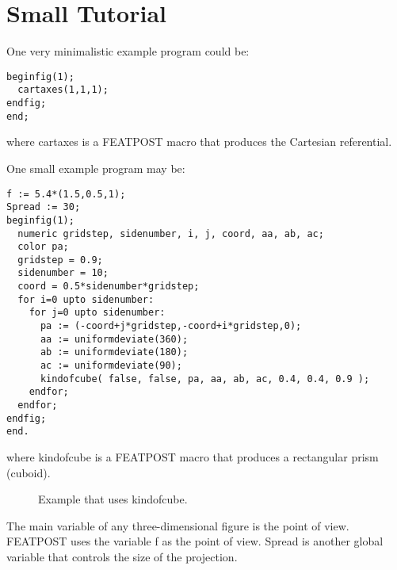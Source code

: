 \documentclass[a4paper]{article}
\newif\ifpdf
\begin{document}
\section{Small Tutorial}

One very minimalistic example program could be:
\begin{tscreen}
\begin{verbatim}
beginfig(1);
  cartaxes(1,1,1);
endfig;
end;
\end{verbatim}
\end{tscreen}
where {\ttfamily cartaxes} is a 
{\ttfamily FEATPOST} macro that produces
the Cartesian referential.

One small example program may be:
\begin{tscreen}
\begin{verbatim}
f := 5.4*(1.5,0.5,1);
Spread := 30;
beginfig(1);
  numeric gridstep, sidenumber, i, j, coord, aa, ab, ac;
  color pa;
  gridstep = 0.9;
  sidenumber = 10;
  coord = 0.5*sidenumber*gridstep;
  for i=0 upto sidenumber:
    for j=0 upto sidenumber:
      pa := (-coord+j*gridstep,-coord+i*gridstep,0);
      aa := uniformdeviate(360);
      ab := uniformdeviate(180);
      ac := uniformdeviate(90);
      kindofcube( false, false, pa, aa, ab, ac, 0.4, 0.4, 0.9 );
    endfor;
  endfor;
endfig;
end.
\end{verbatim}
\end{tscreen}
where {\ttfamily kindofcube} 
is a {\ttfamily FEATPOST} macro that produces
a rectangular prism (cuboid).

\begin{figure}[tbp]
\ifpdf

\else
\centerline{}\fi
\ifpdf
\centerline{\epsfig{file=../nontextualpng/kindofcube.1.png}}\fi
\caption{Example that uses {\ttfamily kindofcube}.}
\end{figure}
\label{figkindofcube1}

The main variable of any three-dimensional figure is the
point of view. {\ttfamily FEATPOST} uses the variable {\ttfamily f}
as the point of view. {\ttfamily Spread} is another global
variable that controls the size of the projection.
\end{document}
